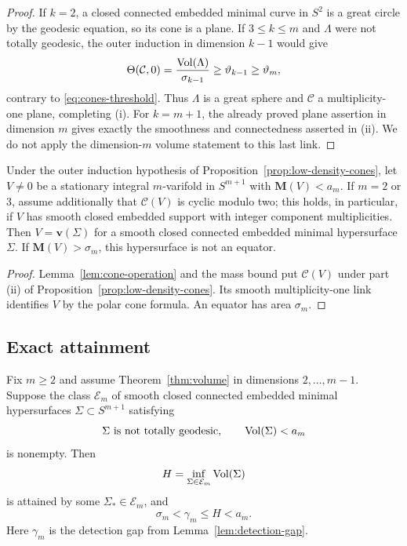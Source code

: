 \begin{proof}
If $k=2$, a closed connected embedded minimal curve in $S^2$ is a
great circle by the geodesic equation, so its cone is a plane.
If $3\leq k\leq m$ and $\Lambda$ were not totally geodesic, the
outer induction in dimension $k-1$ would give
\[
 \Theta(\mathcal C,0)
   =\frac{\operatorname{Vol}(\Lambda)}{\sigma_{k-1}}
   \geq\vartheta_{k-1}\geq\vartheta_m,
\]
contrary to \eqref{eq:cones-threshold}.  Thus $\Lambda$ is a
great sphere and $\mathcal C$ a multiplicity-one plane, completing
(i).  For $k=m+1$, the already proved plane assertion in dimension
$m$ gives exactly the smoothness and connectedness asserted in
(ii).  We do not apply the dimension-$m$ volume statement to this
last link.
\end{proof}

\begin{corollary}\label{cor:cones-spherical-output}
Under the outer induction hypothesis of
Proposition~\ref{prop:low-density-cones}, let $V\ne0$ be a
stationary integral $m$-varifold in $S^{m+1}$ with
$\mathbf M(V)<a_m$.  If $m=2$ or $3$, assume additionally that
$\mathcal C(V)$ is cyclic modulo two; this holds, in particular,
if $V$ has smooth closed embedded support with integer component
multiplicities.  Then $V=\mathbf v(\Sigma)$ for a smooth closed connected
embedded minimal hypersurface $\Sigma$.
If $\mathbf M(V)>\sigma_m$, this hypersurface is not an equator.
\end{corollary}

\begin{proof}
Lemma~\ref{lem:cone-operation} and the mass bound put
$\mathcal C(V)$ under part (ii) of
Proposition~\ref{prop:low-density-cones}.  Its smooth
multiplicity-one link identifies $V$ by the polar cone formula.
An equator has area $\sigma_m$.
\end{proof}

\subsection{Exact attainment}

\begin{proposition}\label{prop:attainment}
Fix $m\geq2$ and assume Theorem~\ref{thm:volume} in dimensions
$2,\ldots,m-1$.  Suppose the class $\mathcal E_m$ of smooth
closed connected embedded minimal hypersurfaces
$\Sigma\subset S^{m+1}$ satisfying
\[
 \Sigma\text{ is not totally geodesic},\qquad \operatorname{Vol}(\Sigma)<a_m
\]
is nonempty.  Then
\[
 H=\inf_{\Sigma\in\mathcal E_m}\operatorname{Vol}(\Sigma)
\]
is attained by some $\Sigma_*\in\mathcal E_m$, and
\begin{equation}\label{eq:cones-attainment-gap}
 \sigma_m<\gamma_m\leq H<a_m.
\end{equation}
Here $\gamma_m$ is the detection gap from
Lemma~\ref{lem:detection-gap}.
\end{proposition}

